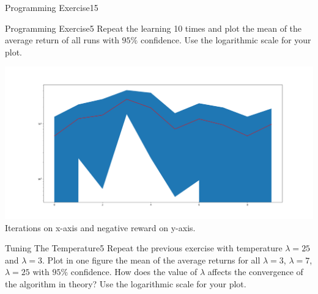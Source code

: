 \begin{questions}
\begin{question}{Programming Exercise}{15}
\begin{answer}
\end{answer}

 \end{question}




\begin{question}{Programming Exercise}{5}
Repeat the learning 10 times and plot the mean of the average return of all runs with $95\%$ confidence.
Use the logarithmic scale for your plot.

    
\begin{answer}
\includegraphics[width=174mm]{7-mean2.png}
Iterations on x-axis and negative reward on y-axis.\\

\end{answer}

\end{question}




\begin{question}{Tuning The Temperature}{5}
Repeat the previous exercise with temperature $\lambda = 25$ and $\lambda = 3$. Plot in one figure the mean of the average returns for all $\lambda = 3$, $\lambda = 7$, $\lambda = 25$ with $95\%$ confidence.
How does the value of $\lambda$ affects the convergence of the algorithm in theory? 
Use the logarithmic scale for your plot.


\end{question}
\end{questions}
